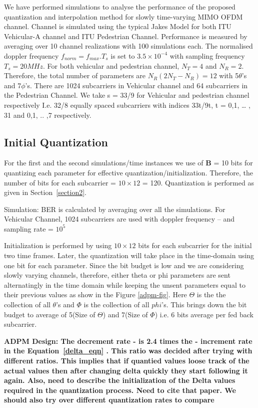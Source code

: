 \documentclass[conference]{IEEEtran}
\begin{document}
 We have performed simulations to analyse the performance of the proposed quantization and interpolation method for slowly time-varying MIMO OFDM channel. Channel is simulated using the typical Jakes Model for both ITU Vehicular-A channel and ITU Pedestrian Channel. Performance is measured by averaging over 10 channel realizations with 100 simulations each. The normalised doppler frequency $f_{norm} = f_{max}.T_s$ is set to $3.5\times10^{-4}$ with sampling frequency $T_s = 20MHz$. For both vehicular and pedestrian channel, $N_T=4$ and $N_R=2$. Therefore, the total number of parameters are $N_{R}(2N_{T} - N_{R}) = 12$ with 5$\theta$’s and 7$\phi$’s. There are 1024 subcarriers in Vehicular channel and 64 subcarriers in the Pedestrian Channel. We take s = 33/9 for Vehicular and pedestrian channel respectively I.e. 32/8 equally spaced subcarriers with indices 33t/9t, t = 0,1, … , 31 and 0,1, .. ,7 respectively.  

\subsection{Initial Quantization} 
For the first and the second simulations/time instances we use of $\textbf{B}$ = 10 bits for quantizing each parameter for effective quantization/initialization. Therefore, the number of bits for each subcarrier = $10\times12$ = 120. Quantization is performed as given in Section~\ref{section2}. 

Simulation: BER is calculated by averaging over all the simulations. For Vehicular Channel, 1024 subcarriers are used with doppler frequency – and sampling rate = $10^{5}$

Initialization is performed by using $10\times12$ bits for each subcarrier for the initial two time frames. Later, the quantization will take place in the time-domain using one bit for each parameter. Since the bit budget is low and we are considering slowly varying channels, therefore, either theta or phi parameters are sent alternatingly in the time domain while keeping the unsent parameters equal to their previous values as show in the Figure \ref{adpm-fig}. Here $\Theta$ is the the collection of all $\theta$'s and $\Phi$ is the collection of all $phi$'s. This brings down the bit budget to average of 5(Size of $\Theta$) and 7(Size of $\Phi$) i.e. 6 bits average per fed back subcarrier. 

\bf{ADPM Design}: The decrement rate - \bm is 2.4 times the \bM - increment rate in the Equation~\ref{delta_eqn} . This ratio was decided after trying with different ratios. This implies that if quantied values loose track of the actual values then after changing delta quickly they start following it again.
Also, need to describe the initialization of the Delta values required in the quantization process. Need to cite that paper. We should also try over different quantization rates to compare 
\end{document}

